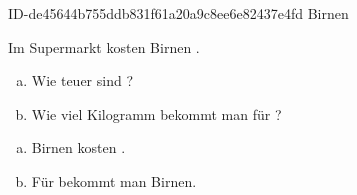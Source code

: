\begin{exercise}
      {ID-de45644b755ddb831f61a20a9c8ee6e82437e4fd}
      {Birnen}
  \ifproblem\problem\par
    Im Supermarkt kosten  Birnen .
    \begin{enumerate}[a)]
      \item Wie teuer sind ?
      \item Wie viel Kilogramm bekommt man für ?
    \end{enumerate}
  \fi
  \ifoutcome\outcome\par
    \begin{enumerate}[a)]
      \item {} Birnen kosten .
      \item Für  bekommt man  Birnen.
    \end{enumerate}
  \fi
\end{exercise}
